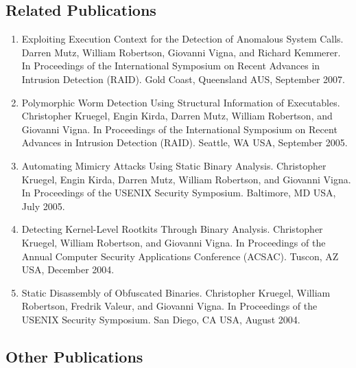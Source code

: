 \documentclass[letterpaper,twoside,11pt,headings=small]{scrartcl}
\begin{document}
\subsection*{Related Publications}

\begin{enumerate}
    \item Exploiting Execution Context for the Detection of Anomalous System Calls.
    Darren Mutz, William Robertson, Giovanni Vigna, and Richard Kemmerer.
    In Proceedings of the International Symposium on Recent Advances in Intrusion Detection (RAID).
    Gold Coast, Queensland AUS, September 2007.
    \item Polymorphic Worm Detection Using Structural Information of Executables.
    Christopher Kruegel, Engin Kirda, Darren Mutz, William Robertson, and Giovanni Vigna.
    In Proceedings of the International Symposium on Recent Advances in Intrusion Detection (RAID).
    Seattle, WA USA, September 2005.
    \item Automating Mimicry Attacks Using Static Binary Analysis.
    Christopher Kruegel, Engin Kirda, Darren Mutz, William Robertson, and Giovanni Vigna.
    In Proceedings of the USENIX Security Symposium.
    Baltimore, MD USA, July 2005.
    \item Detecting Kernel-Level Rootkits Through Binary Analysis.
    Christopher Kruegel, William Robertson, and Giovanni Vigna.
    In Proceedings of the Annual Computer Security Applications Conference (ACSAC).
    Tuscon, AZ USA, December 2004.
    \item Static Disassembly of Obfuscated Binaries.
    Christopher Kruegel, William Robertson, Fredrik Valeur, and Giovanni Vigna.
    In Proceedings of the USENIX Security Symposium.
    San Diego, CA USA, August 2004.
\end{enumerate}

\subsection*{Other Publications}
\end{document}
